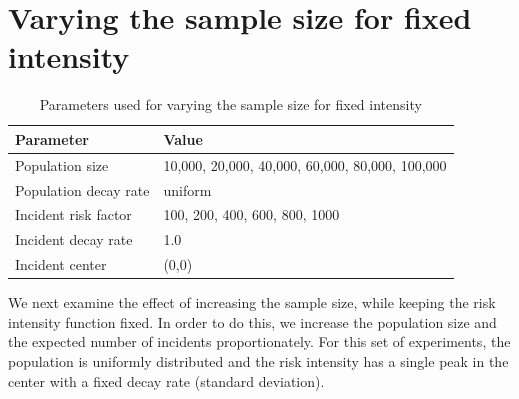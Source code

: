 \section{Varying the sample size for fixed intensity}
\label{sec:results:unifNpop_1h}

\begin{table}[htbp]
\centering
\begin{tabular}{ll}
\hline
Parameter & Value \\
\hline
Population size & 10,000, 20,000, 40,000, 60,000, 80,000, 100,000 \\
Population decay rate & uniform \\
Incident risk factor & 100, 200, 400, 600, 800, 1000 \\
Incident decay rate & 1.0 \\
Incident center & (0,0) \\
\hline
\end{tabular}
\caption{Parameters used for varying the sample size for fixed intensity}
\label{tbl:params:unifNpop_1h}
\end{table}


We next examine the effect of increasing the sample size, while keeping the risk intensity function fixed.
In order to do this, we increase the population size and the expected number of incidents proportionately.
For this set of experiments, the population is uniformly distributed and the risk intensity has a single peak in the center with a fixed decay rate (standard deviation).

